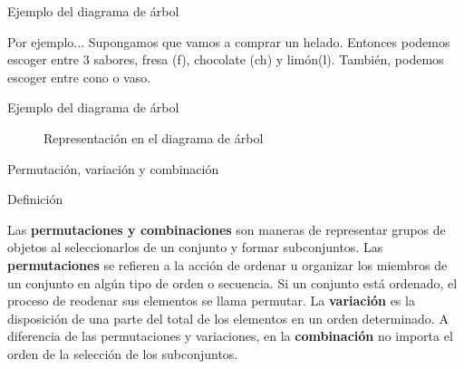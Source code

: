 \documentclass{beamer}
\begin{document}
\begin{frame}{Ejemplo del diagrama de \'arbol}

  \begin{exampleblock}{Por ejemplo...}
    {Supongamos que vamos a comprar un helado. Entonces podemos escoger entre 3
    sabores, fresa (f), chocolate (ch) y lim\'on(l). Tambi\'en, podemos escoger entre
    cono o vaso.}
  \end{exampleblock}

\end{frame}

\begin{frame}{Ejemplo del diagrama de \'arbol}
  \begin{figure}[h]
    \begin{center}		
      \end{center}
      \caption{Representaci\'on en el diagrama de \'arbol}
      \label{permutaciones_tree}
  \end{figure}
\end{frame}

\begin{frame}{Permutaci\'on, variaci\'on y combinaci\'on}

  \begin{block}{Definici\'on}

    Las \textbf{permutaciones y combinaciones} son maneras de representar grupos de objetos
    al seleccionarlos de un conjunto y formar subconjuntos.
    \vfill
     Las \textbf{permutaciones} se refieren a la acci\'on de ordenar u organizar los miembros de
    un conjunto en alg\'un tipo de orden o secuencia. Si un conjunto est\'a ordenado, el
    proceso de reodenar sus elementos se llama permutar.
    \vfill
     La \textbf{variaci\'on} es la disposici\'on de una parte del total de los elementos en un
    orden determinado.
    \vfill
     A diferencia de las permutaciones y variaciones, en la \textbf{combinaci\'on} no importa el orden de la
    selecci\'on de los subconjuntos.

  \end{block}

\end{frame}
\end{document}
